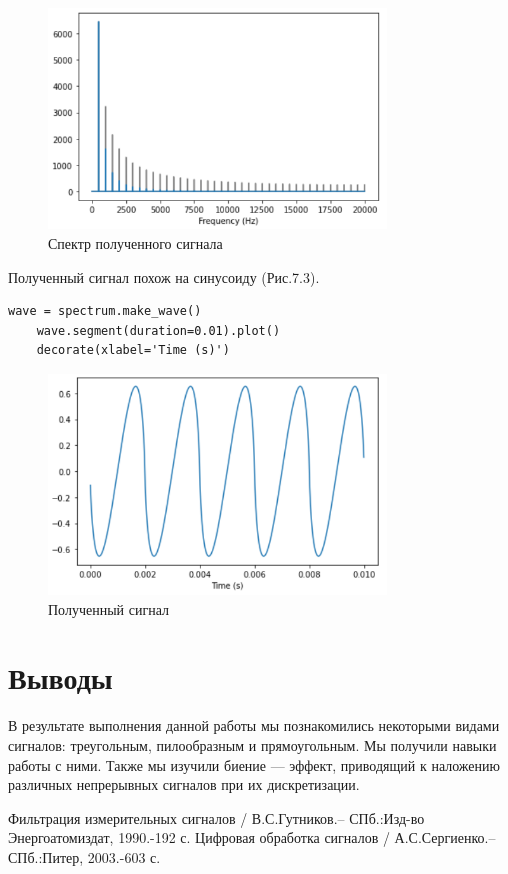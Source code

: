 \documentclass[a4paper,12pt]{report}
\begin{document}
\begin{figure}[H]
        \centering
        \includegraphics[width=0.8\textwidth]{fig7-2.PNG}
        \caption{Спектр полученного сигнала}
        \label{fig:fig7-2}
\end{figure}

    Полученный сигнал похож на синусоиду (Рис.7.3).
\begin{lstlisting}[caption=Получение сигнала]
    wave = spectrum.make_wave()
    wave.segment(duration=0.01).plot()
    decorate(xlabel='Time (s)')
\end{lstlisting}

\begin{figure}[H]
        \centering
        \includegraphics[width=0.8\textwidth]{fig7-3.PNG}
        \caption{Полученный сигнал}
        \label{fig:fig7-3}
\end{figure}

\chapter{Выводы}
    В результате выполнения данной работы мы познакомились некоторыми видами сигналов: треугольным, пилообразным и прямоугольным. Мы получили навыки работы с ними. 
    Также мы изучили биение — эффект, приводящий к наложению различных непрерывных сигналов при их дискретизации.

\begin{thebibliography}{}
      Фильтрация измерительных сигналов / В.С.Гутников.– СПб.:Изд-во Энергоатомиздат, 1990.-192 с.
      Цифровая обработка сигналов / А.С.Сергиенко.– СПб.:Питер, 2003.-603 с.
\end{thebibliography}
\end{document}
